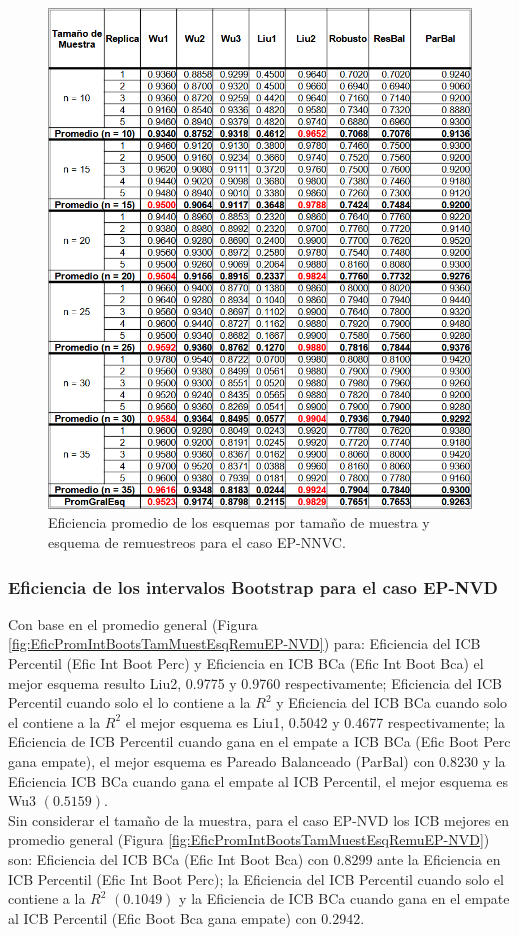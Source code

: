 \begin{figure}[ht] 
	\centering 
	\includegraphics[width=0.70\linewidth]{img/EP_NNVC_Efic_Esq.png} 
	\caption{Eficiencia promedio de los esquemas por tamaño de muestra y esquema de remuestreos para el caso EP-NNVC.} 
	\label{fig:EficPromEsqTamMuesEsqRemuEP-NNVC}
\end{figure}
\FloatBarrier



\subsubsection{Eficiencia de los intervalos Bootstrap para el caso EP-NVD}
Con base en el promedio general (Figura \ref{fig:EficPromIntBootsTamMuestEsqRemuEP-NVD}) para: Eficiencia del ICB Percentil (Efic Int Boot Perc) y Eficiencia en ICB BCa (Efic Int Boot Bca) el mejor esquema resulto Liu2, 0.9775 y 0.9760 respectivamente; Eficiencia del ICB Percentil cuando solo el lo contiene a la $R^{2}$ y Eficiencia del ICB BCa cuando solo el contiene a la $R^{2}$ el mejor esquema es Liu1, 0.5042 y 0.4677 respectivamente; 
la Eficiencia de ICB Percentil cuando gana en el empate a ICB BCa (Efic Boot Perc gana empate), el mejor esquema es Pareado Balanceado (ParBal) con 0.8230 y la Eficiencia ICB BCa cuando gana el empate al ICB Percentil, el mejor esquema es Wu3 $(0.5159)$.\\


Sin considerar el tamaño de la muestra, para el caso EP-NVD los ICB mejores en promedio general (Figura \ref{fig:EficPromIntBootsTamMuestEsqRemuEP-NVD}) son: Eficiencia del ICB BCa (Efic Int Boot Bca) con $0.8299$ ante la Eficiencia en ICB Percentil (Efic Int Boot Perc); la Eficiencia del ICB Percentil cuando solo el contiene a la $R^{2}$ $(0.1049)$ y la Eficiencia de ICB BCa cuando gana en el empate al ICB Percentil (Efic Boot Bca gana empate) con $0.2942$.


